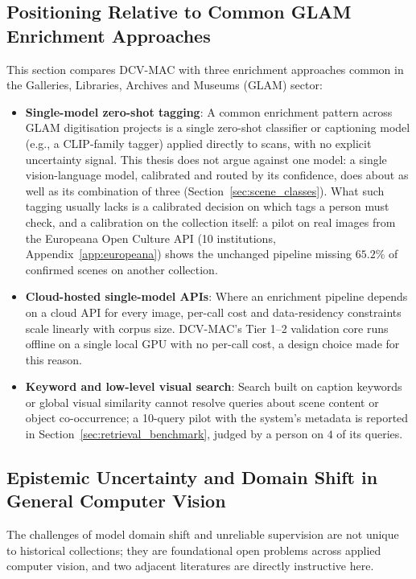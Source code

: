 \documentclass[12pt,a4paper]{report}
\begin{document}
\subsection{Positioning Relative to Common GLAM Enrichment Approaches}
This section compares DCV-MAC with three enrichment approaches common in the Galleries, Libraries, Archives and Museums (GLAM) sector:
\begin{itemize}
    \item \textbf{Single-model zero-shot tagging}: A common enrichment pattern across GLAM digitisation
    projects is a single zero-shot classifier or captioning model (e.g., a CLIP-family tagger) applied
    directly to scans, with no explicit uncertainty signal. This thesis does not argue against one model: a single vision-language model, calibrated and routed by its confidence, does about as well as its combination of three (Section~\ref{sec:scene_classes}). What such tagging usually lacks is a calibrated decision on which tags a person must check, and a calibration on the collection itself: a pilot on real images from the Europeana Open Culture API (10 institutions, Appendix~\ref{app:europeana}) shows the unchanged pipeline missing $65.2\%$ of confirmed scenes on another collection.
    \item \textbf{Cloud-hosted single-model APIs}: Where an enrichment pipeline depends on a cloud API for
    every image, per-call cost and data-residency constraints scale linearly with corpus size. DCV-MAC's
    Tier 1--2 validation core runs offline on a single local GPU with no per-call cost, a design choice made for this reason.
    \item \textbf{Keyword and low-level visual search}: Search built on caption keywords or global visual similarity cannot resolve queries about scene content or object co-occurrence; a 10-query pilot with the system's metadata is reported in Section~\ref{sec:retrieval_benchmark}, judged by a person on $4$ of its queries.
\end{itemize}

\subsection{Epistemic Uncertainty and Domain Shift in General Computer Vision}
The challenges of model domain shift and unreliable supervision are not unique to historical collections; they are foundational open problems across applied computer vision, and two adjacent literatures are directly instructive here.
\end{document}
